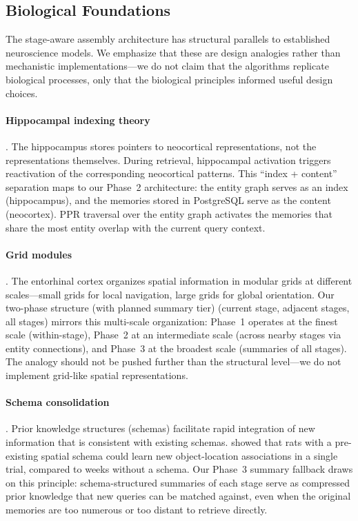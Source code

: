 \documentclass[11pt]{article}
\begin{document}
\subsection{Biological Foundations}
\label{sec:bio-foundations}

The stage-aware assembly architecture has structural parallels to
established neuroscience models.  We emphasize that these are design
analogies rather than mechanistic implementations---we do not claim
that the algorithms replicate biological processes, only that the
biological principles informed useful design choices.

\paragraph{Hippocampal indexing theory} \citep{Teyler2007}.
The hippocampus stores pointers to neocortical representations, not
the representations themselves.  During retrieval, hippocampal
activation triggers reactivation of the corresponding neocortical
patterns.  This ``index + content'' separation maps to our Phase~2
architecture: the entity graph serves as an index (hippocampus),
and the memories stored in PostgreSQL serve as the content
(neocortex).  PPR traversal over the entity graph activates the
memories that share the most entity overlap with the current query
context.

\paragraph{Grid modules} \citep{Stensola2012}.
The entorhinal cortex organizes spatial information in modular grids
at different scales---small grids for local navigation, large grids
for global orientation.  Our two-phase structure (with planned summary tier) (current stage,
adjacent stages, all stages) mirrors this multi-scale organization:
Phase~1 operates at the finest scale (within-stage), Phase~2 at an
intermediate scale (across nearby stages via entity connections), and
Phase~3 at the broadest scale (summaries of all stages).  The analogy
should not be pushed further than the structural level---we do not
implement grid-like spatial representations.

\paragraph{Schema consolidation} \citep{Tse2007}.
Prior knowledge structures (schemas) facilitate rapid integration of
new information that is consistent with existing schemas.
\citet{Tse2007} showed that rats with a pre-existing spatial schema
could learn new object-location associations in a single trial,
compared to weeks without a schema.  Our Phase~3 summary fallback
draws on this principle: schema-structured summaries of each stage
serve as compressed prior knowledge that new queries can be matched
against, even when the original memories are too numerous or too
distant to retrieve directly.
\end{document}
